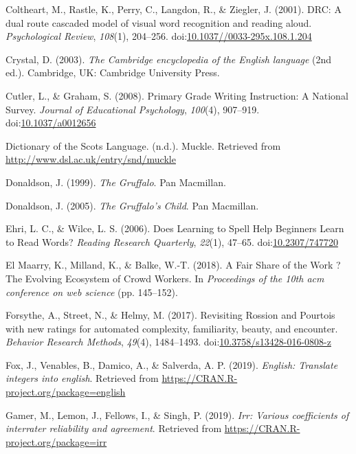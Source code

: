 \documentclass[doc,floatsintext]{apa6}
\begin{document}
\hypertarget{ref-Coltheart2001}{}
Coltheart, M., Rastle, K., Perry, C., Langdon, R., \& Ziegler, J.
(2001). DRC: A dual route cascaded model of visual word recognition and
reading aloud. \emph{Psychological Review}, \emph{108}(1), 204--256.
doi:\href{https://doi.org/10.1037//0033-295x.108.1.204}{10.1037//0033-295x.108.1.204}

\hypertarget{ref-Crystal2003}{}
Crystal, D. (2003). \emph{The Cambridge encyclopedia of the English
language} (2nd ed.). Cambridge, UK: Cambridge University Press.

\hypertarget{ref-Cutler2008}{}
Cutler, L., \& Graham, S. (2008). Primary Grade Writing Instruction: A
National Survey. \emph{Journal of Educational Psychology},
\emph{100}(4), 907--919.
doi:\href{https://doi.org/10.1037/a0012656}{10.1037/a0012656}

\hypertarget{ref-DictionaryoftheScotsLanguage}{}
Dictionary of the Scots Language. (n.d.). Muckle. Retrieved from
\url{http://www.dsl.ac.uk/entry/snd/muckle}

\hypertarget{ref-Donaldson1999}{}
Donaldson, J. (1999). \emph{The Gruffalo}. Pan Macmillan.

\hypertarget{ref-Donaldson2005}{}
Donaldson, J. (2005). \emph{The Gruffalo's Child}. Pan Macmillan.

\hypertarget{ref-Ehri2006}{}
Ehri, L. C., \& Wilce, L. S. (2006). Does Learning to Spell Help
Beginners Learn to Read Words? \emph{Reading Research Quarterly},
\emph{22}(1), 47--65.
doi:\href{https://doi.org/10.2307/747720}{10.2307/747720}

\hypertarget{ref-ElMaarry2018}{}
El Maarry, K., Milland, K., \& Balke, W.-T. (2018). A Fair Share of the
Work ? The Evolving Ecosystem of Crowd Workers. In \emph{Proceedings of
the 10th acm conference on web science} (pp. 145--152).

\hypertarget{ref-Forsythe2017}{}
Forsythe, A., Street, N., \& Helmy, M. (2017). Revisiting Rossion and
Pourtois with new ratings for automated complexity, familiarity, beauty,
and encounter. \emph{Behavior Research Methods}, \emph{49}(4),
1484--1493.
doi:\href{https://doi.org/10.3758/s13428-016-0808-z}{10.3758/s13428-016-0808-z}

\hypertarget{ref-R-english}{}
Fox, J., Venables, B., Damico, A., \& Salverda, A. P. (2019).
\emph{English: Translate integers into english}. Retrieved from
\url{https://CRAN.R-project.org/package=english}

\hypertarget{ref-R-irr}{}
Gamer, M., Lemon, J., Fellows, I., \& Singh, P. (2019). \emph{Irr:
Various coefficients of interrater reliability and agreement}. Retrieved
from \url{https://CRAN.R-project.org/package=irr}
\end{document}
